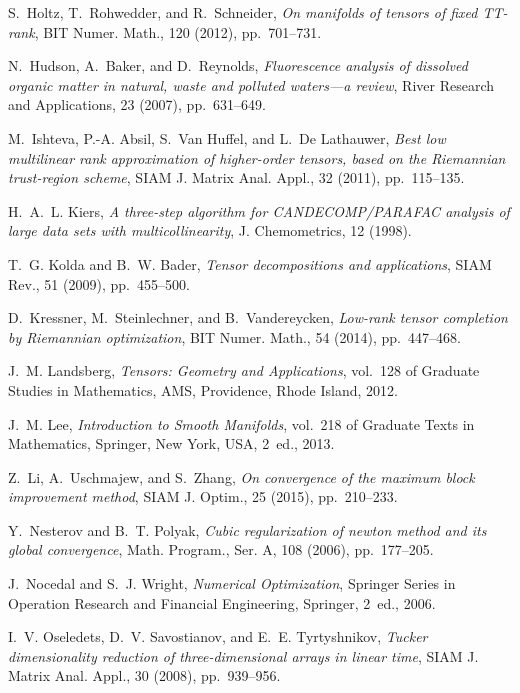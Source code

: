 \documentclass[a4paper,10pt,final]{siamart1116}
\numberwithin{equation}{section}
\numberwithin{figure}{section}
\numberwithin{table}{section}
\numberwithin{theorem}{section}
\begin{document}
\begin{thebibliography}{10}
{\sc S.~Holtz, T.~Rohwedder, and R.~Schneider}, {\em {On manifolds of tensors
  of fixed TT-rank}}, BIT Numer. Math., 120 (2012), pp.~701--731.

{\sc N.~Hudson, A.~Baker, and D.~Reynolds}, {\em Fluorescence analysis of
  dissolved organic matter in natural, waste and polluted waters---a review},
  River Research and Applications, 23 (2007), pp.~631--649.

{\sc M.~Ishteva, P.-A. Absil, S.~{Van Huffel}, and L.~{De Lathauwer}}, {\em
  Best low multilinear rank approximation of higher-order tensors, based on the
  {R}iemannian trust-region scheme}, SIAM J. Matrix Anal. Appl., 32 (2011),
  pp.~115--135.

{\sc H.~A.~L. Kiers}, {\em A three-step algorithm for {CANDECOMP/PARAFAC}
  analysis of large data sets with multicollinearity}, J. Chemometrics, 12
  (1998).

{\sc T.~G. Kolda and B.~W. Bader}, {\em Tensor decompositions and
  applications}, SIAM Rev., 51 (2009), pp.~455--500.

{\sc D.~Kressner, M.~Steinlechner, and B.~Vandereycken}, {\em Low-rank tensor
  completion by {Riemannian} optimization}, BIT Numer. Math., 54 (2014),
  pp.~447--468.

{\sc J.~M. Landsberg}, {\em {Tensors: Geometry and Applications}}, vol.~128 of
  Graduate Studies in Mathematics, AMS, Providence, Rhode Island, 2012.

{\sc J.~M. Lee}, {\em {Introduction to Smooth Manifolds}}, vol.~218 of Graduate
  Texts in Mathematics, Springer, New York, USA, 2~ed., 2013.

{\sc Z.~Li, A.~Uschmajew, and S.~Zhang}, {\em On convergence of the maximum
  block improvement method}, SIAM J. Optim., 25 (2015), pp.~210--233.

{\sc Y.~Nesterov and B.~T. Polyak}, {\em Cubic regularization of newton method
  and its global convergence}, Math. Program., Ser. A, 108 (2006),
  pp.~177--205.

{\sc J.~Nocedal and S.~J. Wright}, {\em {Numerical Optimization}}, Springer
  Series in Operation Research and Financial Engineering, Springer, 2~ed.,
  2006.

{\sc I.~V. Oseledets, D.~V. Savostianov, and E.~E. Tyrtyshnikov}, {\em {Tucker}
  dimensionality reduction of three-dimensional arrays in linear time}, SIAM J.
  Matrix Anal. Appl., 30 (2008), pp.~939--956.


\end{thebibliography}
\end{document}
